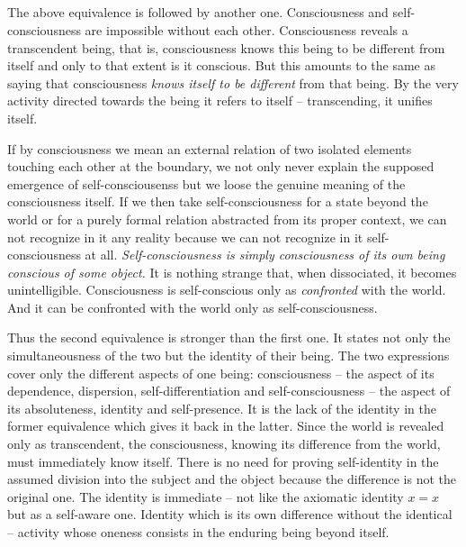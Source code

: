 \subsection{}\label{sg:ii}
The above equivalence is followed by another one. Consciousness and self-consciousness are impossible 
without each other. Consciousness reveals a transcendent being, that is, consciousness knows this being to be 
different from itself and only to that extent is it conscious. But this amounts to the same as saying that 
consciousness {\em knows itself to be different} from that being. By the very activity directed towards the being it refers 
to itself -- transcending, it unifies itself.

If by consciousness we mean an external relation of two isolated elements touching each other at the boundary, 
we not only never explain the supposed emergence of self-consciousenss but we loose the genuine meaning of the 
consciousness itself. If we then take self-consciousness for a state beyond the world or for a purely formal relation 
abstracted from its proper context, we can not recognize in it any reality because we can not recognize in it self-consciousness at all. {\em Self-consciousness is simply consciousness of its own being conscious of some object.} It is 
nothing strange that, when dissociated, it becomes unintelligible. Consciousness is self-conscious only as 
{\em confronted} with the world. And it can be confronted with the world only as self-consciousness.

Thus the second equivalence is stronger than the first one. It states not only the simultaneousness of the two but 
the identity of their being. The two expressions cover only the different aspects of one being: consciousness -- the 
aspect of its dependence, dispersion, self-differentiation and self-consciousness -- the aspect of its absoluteness, 
identity and self-presence. It is the lack of the identity in the former equivalence which gives it back in the latter. 
Since the world is revealed only as transcendent, the consciousness, knowing its difference from the world, must 
immediately know itself. There is no need for proving self-identity in the assumed division into the subject and the 
object because the difference is not the original one. The identity is immediate -- not like the axiomatic identity $x=x$ 
but as a self-aware one. Identity which is its own difference without the identical -- activity whose oneness consists 
in the enduring being beyond itself.

